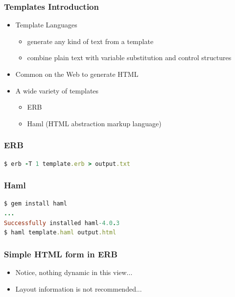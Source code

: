 \documentclass{beamer}
\begin{document}
\begin{frame}[fragile]\frametitle{Templates Introduction}

  \begin{itemize}
    \item Template Languages
    \begin{itemize}
      \item generate any kind of text from a template
      \item combine plain text with variable substitution and control structures
    \end{itemize}

    \item Common on the Web to generate HTML
    \item A wide variety of templates
    \begin{itemize}
      \item ERB
      \item Haml (HTML abstraction markup language)
    \end{itemize}

  \end{itemize}
\end{frame}


\begin{frame}[fragile]\frametitle{ERB}

  
  
  \begin{lstlisting}[language=ruby, escapechar={^}]
$ erb -T 1 template.erb > output.txt
  \end{lstlisting}
  
  
  
\end{frame}


\begin{frame}[fragile]\frametitle{Haml}

  
  
  \begin{lstlisting}[language=ruby, escapechar={^}]
$ gem install haml
...
Successfully installed haml-4.0.3
$ haml template.haml output.html
  \end{lstlisting}
  
  
\end{frame}


\begin{frame}[fragile]\frametitle{Simple HTML form in ERB}

  
  
  \begin{itemize}
    \item Notice, nothing dynamic in this view...
    \item Layout information is not recommended...
  \end{itemize}

\end{frame}
\end{document}
